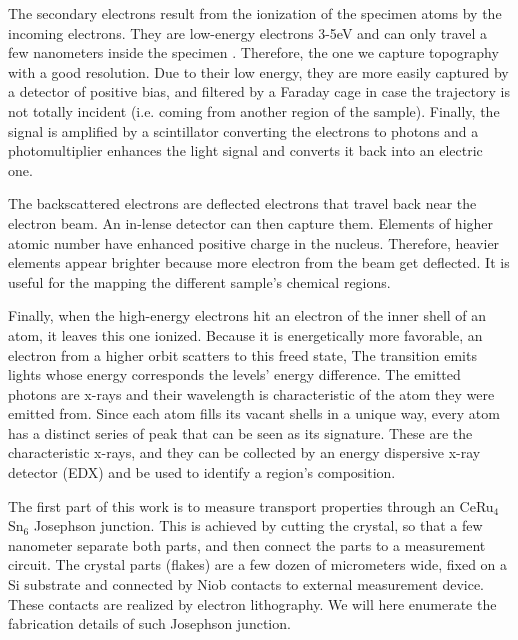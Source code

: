 \documentclass[../main.tex]{subfiles}
\begin{document}
    The secondary electrons result from the ionization of the specimen atoms by the incoming electrons. They are low-energy electrons 3-5eV and can only travel a few 
    nanometers inside the specimen \cite{zhou2006fundamentals}. Therefore, the one we capture topography with a good resolution. Due to their low energy, they are 
    more easily captured by a detector of positive bias, and filtered by a Faraday cage in case the trajectory is not totally incident (i.e. coming from another region of the sample). Finally, the signal is amplified  by a scintillator converting the
    electrons to photons and a photomultiplier enhances the light signal and converts it back into an electric one.
    
    The backscattered electrons are deflected electrons that travel back near the electron beam. An in-lense detector can then capture them. Elements of higher atomic number have enhanced positive
    charge in the nucleus. Therefore, heavier elements appear brighter because more electron from the beam get deflected. It is useful for the mapping the different sample's chemical regions.

    Finally, when the high-energy electrons hit an electron of the inner shell of an atom, it leaves this one ionized. Because it is energetically more
    favorable, an electron from a higher orbit scatters to this freed state,  The transition emits lights whose energy corresponds the levels' energy difference.  The emitted photons are x-rays and their wavelength is characteristic of the atom they were emitted from.
    Since each atom fills its vacant shells in a unique way, every atom has a distinct series of peak that can be seen as its signature. These are the characteristic x-rays, and they can be collected
    by an energy dispersive x-ray detector (EDX) and be used to identify a region's composition.
    \begin{figure}
        \centering
        
        \caption{}
        \label{fig:SEM}
    \end{figure}

    
    The first part of this work is to measure transport properties through an CeRu$_4$Sn$_6$ Josephson junction.
    This is achieved by cutting the crystal, so that a few nanometer separate both parts, and then connect the parts to a measurement circuit. The crystal parts (flakes) are a few dozen of 
    micrometers wide, fixed on a Si substrate and connected by Niob contacts to external measurement device. These contacts are realized by electron lithography.
    We will here enumerate the fabrication details of such Josephson junction.
\end{document}
